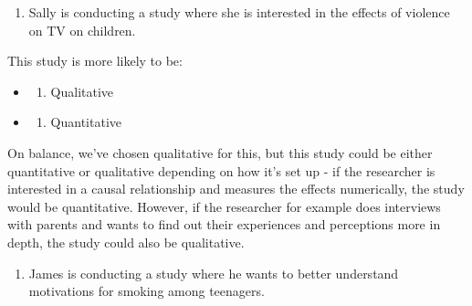 \documentclass[
  english,
  letterpaper,
  DIV=11,
  numbers=noendperiod]{scrreprt}
\providecommand{\tightlist}{%
  \setlength{\itemsep}{0pt}\setlength{\parskip}{0pt}}
\begin{document}
\begin{enumerate}
\def\labelenumi{\arabic{enumi}.}
\setcounter{enumi}{2}
\tightlist
\item
  Sally is conducting a study where she is interested in the effects of
  violence on TV on children.
\end{enumerate}

This study is more likely to be:

\begin{itemize}
\tightlist
\item
  \begin{enumerate}
  \def\labelenumi{(\Alph{enumi})}
  \tightlist
  \item
    Qualitative\\
  \end{enumerate}
\item
  \begin{enumerate}
  \def\labelenumi{(\Alph{enumi})}
  \setcounter{enumi}{1}
  \tightlist
  \item
    Quantitative
  \end{enumerate}
\end{itemize}

\begin{tcolorbox}[enhanced jigsaw, breakable, bottomtitle=1mm, leftrule=.75mm, opacityback=0, colbacktitle=quarto-callout-caution-color!10!white, opacitybacktitle=0.6, toprule=.15mm, colback=white, left=2mm, coltitle=black, bottomrule=.15mm, titlerule=0mm, title={Explain the answer}, toptitle=1mm, colframe=quarto-callout-caution-color-frame, arc=.35mm, rightrule=.15mm]

On balance, we've chosen qualitative for this, but this study could be
either quantitative or qualitative depending on how it's set up - if the
researcher is interested in a causal relationship and measures the
effects numerically, the study would be quantitative. However, if the
researcher for example does interviews with parents and wants to find
out their experiences and perceptions more in depth, the study could
also be qualitative.

\end{tcolorbox}

\begin{enumerate}
\def\labelenumi{\arabic{enumi}.}
\setcounter{enumi}{3}
\tightlist
\item
  James is conducting a study where he wants to better understand
  motivations for smoking among teenagers.
\end{enumerate}
\end{document}
